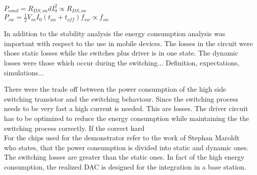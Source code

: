 $ P_{cond} = R_{DS,on}dI_0^2 \propto R_{DS,on} $ \\
$ P_{sw} = \frac{1}{2} V_{in}I_0(t_{on}+t_{off})f_{sw} \propto f_{sw} $ 

In addition to the stability analysis the energy consumption analysis was important with respect to the use in mobile devices.
The losses in the circuit were those static losses while the switches plus driver is in one state.
The dynamic losses were those which occur during the switching...
Definition, expectations, simulations...

There were the trade off between the power consumption of the high side switching transistor and the switching behaviour.
Since the switching process needs to be very fast a high current is needed.
This are losses.
The driver circuit has to be optimized to reduce the energy consumption while maintaining the the switching process correctly.
If the correct hard 
\\
 For the chips used for the demonstrator refer to the work of Stephan Maroldt who states, that the power consumption is divided into static and dynamic ones. The switching losses are greater than the static ones.
In fact of the high energy consumption, the realized DAC is designed for the integration in a base station.

